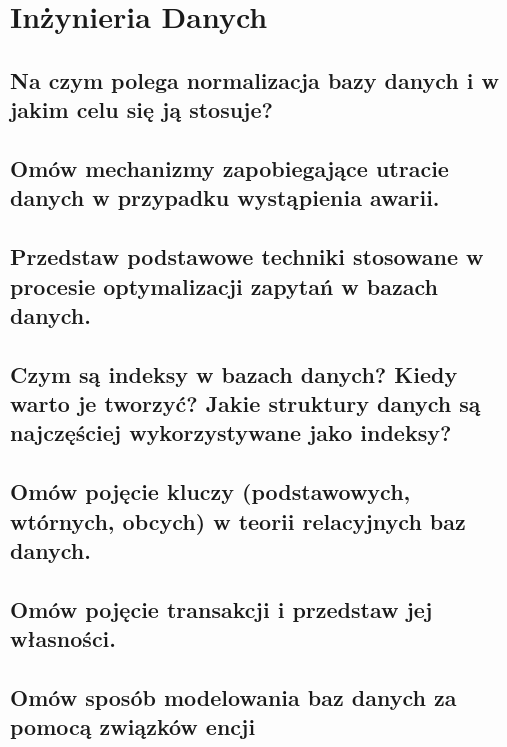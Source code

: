 \chapter{Inżynieria Danych}

\section{Na czym polega normalizacja bazy danych i w jakim celu się ją stosuje?}


\section{Omów mechanizmy zapobiegające utracie danych w przypadku wystąpienia awarii.}


\section{Przedstaw podstawowe techniki stosowane w procesie optymalizacji zapytań w bazach danych.}


\section{Czym są indeksy w bazach danych? Kiedy warto je tworzyć? Jakie struktury danych są najczęściej wykorzystywane jako indeksy?}


\section{Omów pojęcie kluczy (podstawowych, wtórnych, obcych) w teorii relacyjnych baz danych.}


\section{Omów pojęcie transakcji i przedstaw jej własności.}


\section{Omów sposób modelowania baz danych za pomocą związków encji}
